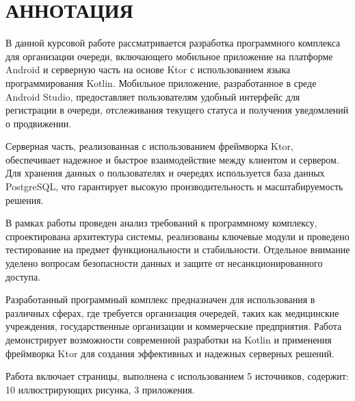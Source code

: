 \chapter*{АННОТАЦИЯ}

В данной курсовой работе рассматривается разработка программного комплекса
для организации очереди, включающего мобильное приложение на платформе Android
и серверную часть на основе Ktor с использованием языка программирования
Kotlin. Мобильное приложение, разработанное в среде Android Studio,
предоставляет пользователям удобный интерфейс для регистрации в очереди,
отслеживания текущего статуса и получения уведомлений о продвижении.\par
Серверная часть, реализованная с использованием фреймворка Ktor,
обеспечивает надежное и быстрое взаимодействие между клиентом и сервером.
Для хранения данных о пользователях и очередях используется база данных
PostgreSQL, что гарантирует высокую производительность
и масштабируемость решения.\par
В рамках работы проведен анализ требований к программному комплексу,
спроектирована архитектура системы, реализованы ключевые модули
и проведено тестирование на предмет функциональности и стабильности.
Отдельное внимание уделено вопросам безопасности данных
и защите от несанкционированного доступа.\par
Разработанный программный комплекс предназначен для использования
в различных сферах, где требуется организация очередей,
таких как медицинские учреждения, государственные организации
и коммерческие предприятия. Работа демонстрирует возможности современной
разработки на Kotlin и применения фреймворка Ktor
для создания эффективных и надежных серверных решений.\par
Работа включает \pageref{lastpage} страницы, выполнена с использованием 5
источников, содержит: 10 иллюстрирующих рисунка, 3 приложения.
